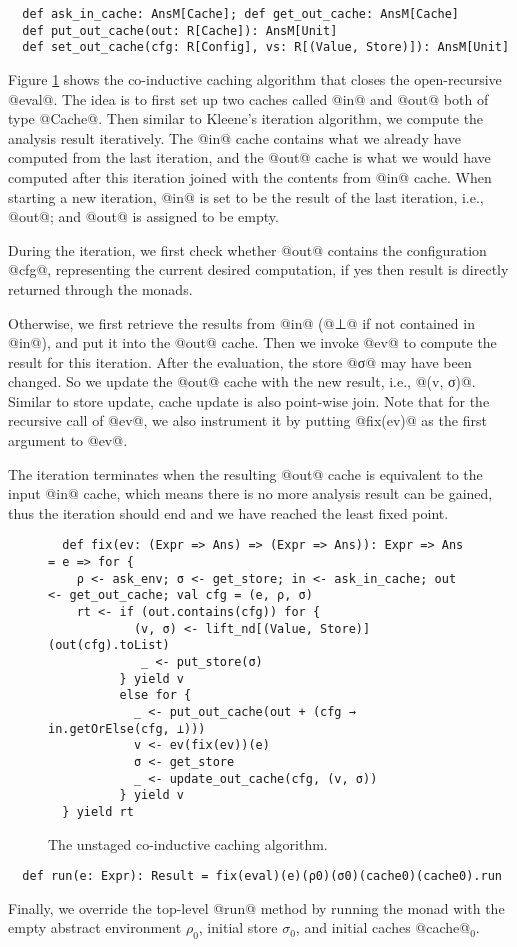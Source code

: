 \begin{lstlisting}
  def ask_in_cache: AnsM[Cache]; def get_out_cache: AnsM[Cache]
  def put_out_cache(out: R[Cache]): AnsM[Unit]
  def set_out_cache(cfg: R[Config], vs: R[(Value, Store)]): AnsM[Unit]
\end{lstlisting}

Figure \ref{fig:coind_cache} shows the co-inductive caching algorithm that
closes the open-recursive @eval@.
The idea is to first set up two caches called @in@ and @out@ both of type
@Cache@. Then similar to Kleene's iteration algorithm, we compute the analysis
result iteratively. The @in@ cache contains what we already have computed from
the last iteration, and the @out@ cache is what we would have computed after this
iteration joined with the contents from @in@ cache.
When starting a new iteration, @in@ is set to be the result of the last
iteration, i.e., @out@; and @out@ is assigned to be empty.

During the iteration, we first check whether @out@ contains the configuration
@cfg@, representing the current desired computation, if
yes then result is directly returned through the monads.

Otherwise, we first retrieve the results from @in@ (@⊥@ if not contained in
@in@), and put it into the @out@ cache.
Then we invoke @ev@ to compute the result for this iteration.
After the evaluation, the store @σ@ may have been changed. So we update the
@out@ cache with the new result, i.e., @(v, σ)@. Similar to store update, cache
update is also point-wise join.
Note that for the recursive call of @ev@, we also instrument it by putting
@fix(ev)@ as the first argument to @ev@.

The iteration terminates when the resulting @out@ cache is equivalent to the
input @in@ cache, which means there is no more analysis result can be gained,
thus the iteration should end and we have reached the least fixed point.

\begin{figure}[t!]
  \centering
\begin{lstlisting}
  def fix(ev: (Expr => Ans) => (Expr => Ans)): Expr => Ans = e => for {
    ρ <- ask_env; σ <- get_store; in <- ask_in_cache; out <- get_out_cache; val cfg = (e, ρ, σ)
    rt <- if (out.contains(cfg)) for {
            (v, σ) <- lift_nd[(Value, Store)](out(cfg).toList)
             _ <- put_store(σ)
          } yield v
          else for {
            _ <- put_out_cache(out + (cfg → in.getOrElse(cfg, ⊥)))
            v <- ev(fix(ev))(e)
            σ <- get_store
            _ <- update_out_cache(cfg, (v, σ))
          } yield v
  } yield rt
\end{lstlisting}
\vspace{-1em}
\caption{The unstaged co-inductive caching algorithm.}
\label{fig:coind_cache}
\end{figure}

\begin{lstlisting}
  def run(e: Expr): Result = fix(eval)(e)(ρ0)(σ0)(cache0)(cache0).run
\end{lstlisting}

Finally, we override the top-level @run@ method by running the monad with
the empty abstract environment $\rho_0$, initial store $\sigma_0$, and initial
caches @cache@$_0$.
